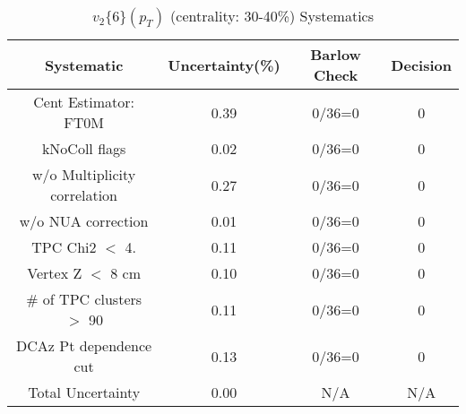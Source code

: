 \begin{table}[htbp]
\caption{$v_2\{6\}(p_{T})$ (centrality: 30-40\%) Systematics}
\label{tab:Sys_pTDiffv26ChFull}
\centering
\begin{tabular}{|c|c|c|c|}
\hline
Systematic & Uncertainty(\%) & Barlow Check & Decision \\
\hline
Cent Estimator: FT0M & 0.39 & 0/36=0 & 0 \\
kNoColl flags & 0.02 & 0/36=0 & 0 \\
w/o Multiplicity correlation & 0.27 & 0/36=0 & 0 \\
w/o NUA correction & 0.01 & 0/36=0 & 0 \\
TPC Chi2 $<$ 4. & 0.11 & 0/36=0 & 0 \\
Vertex Z $<$ 8 cm & 0.10 & 0/36=0 & 0 \\
\# of TPC clusters $>$ 90 & 0.11 & 0/36=0 & 0 \\
DCAz Pt dependence cut & 0.13 & 0/36=0 & 0 \\
\hline
Total Uncertainty & 0.00 & N/A & N/A \\
\hline
\end{tabular}
\end{table}
